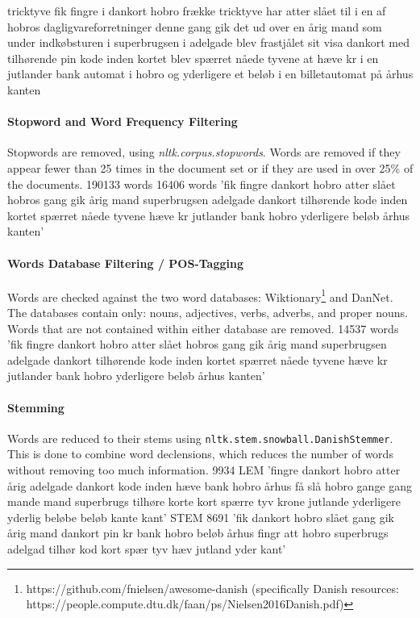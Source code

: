 tricktyve fik fingre i dankort hobro frække tricktyve har atter slået til i en af hobros dagligvareforretninger denne gang gik det ud over en årig mand som under indkøbsturen i superbrugsen i adelgade blev frastjålet sit visa dankort med tilhørende pin kode inden kortet blev spærret nåede tyvene at hæve kr i en jutlander bank automat i hobro og yderligere et beløb i en billetautomat på århus kanten

\paragraph{Stopword and Word Frequency Filtering}
Stopwords are removed, using \emph{nltk.corpus.stopwords}.
Words are removed if they appear fewer than 25 times in the document set or if they are used in over 25\% of the documents.
190133 words
16406 words
'fik fingre dankort hobro atter slået hobros gang gik årig mand superbrugsen adelgade dankort tilhørende kode inden kortet spærret nåede tyvene hæve kr jutlander bank hobro yderligere beløb århus kanten'

\paragraph{Words Database Filtering / POS-Tagging}
Words are checked against the two word databases: Wiktionary\footnote{https://github.com/fnielsen/awesome-danish (specifically Danish resources: https://people.compute.dtu.dk/faan/ps/Nielsen2016Danish.pdf)} and DanNet\cite{Pedersen2009DanNetTC}. 
The databases contain only: nouns, adjectives, verbs, adverbs, and proper nouns. 
Words that are not contained within either database are removed.
14537 words
'fik fingre dankort hobro atter slået hobros gang gik årig mand superbrugsen adelgade dankort tilhørende kode inden kortet spærret nåede tyvene hæve kr jutlander bank hobro yderligere beløb århus kanten'

\paragraph{Stemming}
Words are reduced to their stems using \texttt{nltk.stem.snowball.DanishStemmer}. 
This is done to combine word declensions, which reduces the number of words without removing too much information.
9934
LEM
'fingre dankort hobro atter årig adelgade dankort kode inden hæve bank hobro århus få slå hobro gange gang mande mand superbrugs tilhøre korte kort spærre tyv krone jutlande yderligere yderlig beløbe beløb kante kant'
STEM
8691
'fik dankort hobro slået gang gik årig mand dankort pin kr bank hobro beløb århus fingr att hobro superbrugs adelgad tilhør kod kort spær tyv hæv jutland yder kant'

